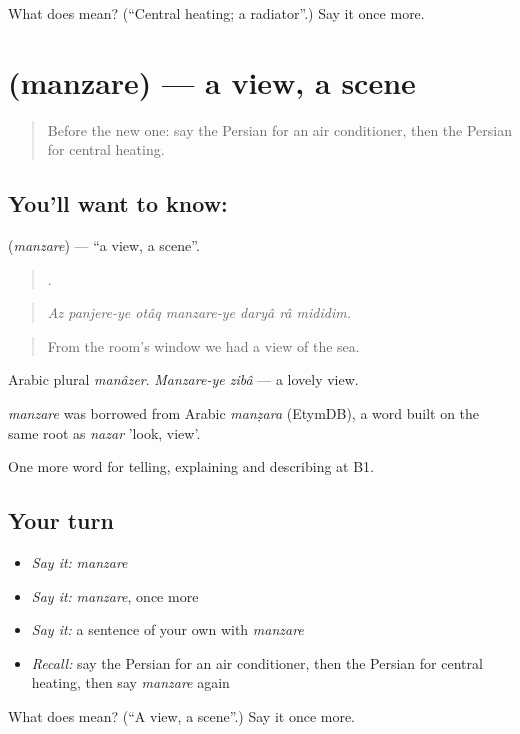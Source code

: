 \begin{tcolorbox}[breakable,colback=teal!4,colframe=teal!35!black,title={Before you move on}]
What does  mean? (\textquotedblleft{}Central heating; a radiator\textquotedblright{}.) Say it once more.
\end{tcolorbox}
\section[\texorpdfstring{\fa{منظره} (manzare)}{منظره (manzare)}]{ (manzare) — a view, a scene}

\label{lesson:FA-C439-manzare}



\begin{quote}
Before the new one: say the Persian for an air conditioner, then the Persian for central heating.
\end{quote}

\subsection*{You'll want to know: }
\textbf{} (\emph{manzare}) — \textquotedblleft{}a view, a scene\textquotedblright{}.

\begin{quote}
      .
\end{quote}

\begin{quote}
\emph{Az panjere-ye otâq manzare-ye daryâ râ mididim.}
\end{quote}

\begin{quote}
From the room's window we had a view of the sea.
\end{quote}

Arabic plural \emph{manâzer}. \emph{Manzare-ye zibâ} — a lovely view.

\begin{cousinweb}
\emph{manzare} was borrowed from Arabic \emph{manẓara} (EtymDB), a word built on the same root as \emph{nazar} 'look, view'.
\end{cousinweb}

\begin{grammarlens}[title={What you've built}]
One more word for telling, explaining and describing at B1.
\end{grammarlens}

\subsection*{Your turn}
\begin{itemize}
\raggedright
  \item \emph{Say it:} \emph{manzare}
  \item \emph{Say it:} \emph{manzare}, once more
  \item \emph{Say it:} a sentence of your own with \emph{manzare}
  \item \emph{Recall:} say the Persian for an air conditioner, then the Persian for central heating, then say \emph{manzare} again
\end{itemize}

\begin{tcolorbox}[breakable,colback=teal!4,colframe=teal!35!black,title={Before you move on}]
What does  mean? (\textquotedblleft{}A view, a scene\textquotedblright{}.) Say it once more.
\end{tcolorbox}

